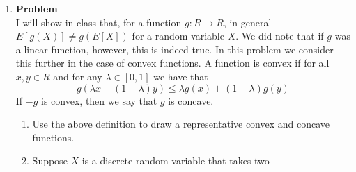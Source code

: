 \documentclass[12pt]{article}
\newenvironment{Ex}{\textbf{Problem}\vspace{.75em}\\}{}
\begin{document}
\begin{enumerate}
\begin{Ex}
      $$ p_X(x) \propto \frac{1}{x^\alpha} \text{ for } x = 1, 2, 3
      \ldots $$ 
      This can be used to model the popularity of web sites, movies,
      songs on iTunes, uses of letters in the alphabet etc.
      \begin{enumerate}
      \item Find an expression in terms of $\alpha$ for the
        proportionality constant making $p_X$ a PMF when $\alpha =
        2$. Note: In general can show that for $\alpha \in [0, 1]$ the
        proportionality constant does not exist and thus there is no
        PMF.
      \item What is the expected value of $X$ when $\alpha = 2$?
      \item Suppose there are a finite number of items, so $x =
        1,2,\ldots, n$ and now let $\alpha = 1$. Find an expression,
        in terms of $n$ for the proportionality constant for the PMF.
      \item How many times more likely is the most popular item versus
        the $x$th most popular item. For some large but finite $n$
        compare this to the case where the popularity profile is given
        by a geometric distribution. Which distribution concentrates
        more probability on the higher ranked, i.e., lower $x$,
        values?
      \end{enumerate}
      \begin{solution} \hfill \\
        {\huge TODO}
      \end{solution}
    \end{Ex}
  \item 
    \begin{Ex}
      I will show in class that, for a function $g : R \rightarrow R$,
      in general $E[g(X)] \not= g(E[X])$ for a random variable $X$. We
      did note that if $g$ was a linear function, however, this is
      indeed true. In this problem we consider this further in the
      case of convex functions. A function is convex if for all $x, y
      \in R$ and for any $\lambda \in [0, 1]$ we have that
      $$ g(\lambda x + (1-\lambda)y) \le \lambda g(x) +
      (1-\lambda)g(y)$$
      If $-g$ is convex, then we say that $g$ is concave.
      \begin{enumerate}
      \item Use the above definition to draw a representative convex
        and concave functions.
      \item Suppose $X$ is a discrete random variable that takes two

\end{enumerate}
\end{Ex}
\end{enumerate}
\end{document}
